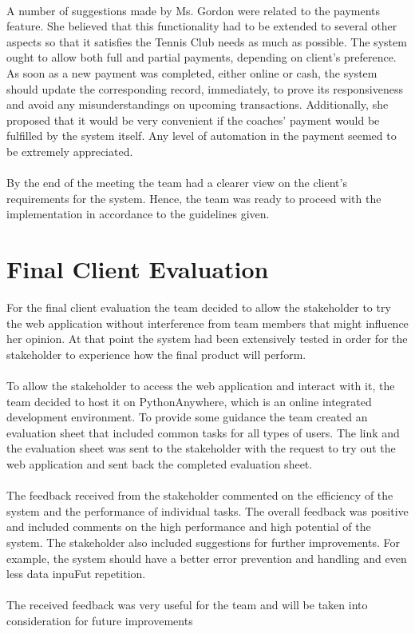 \documentclass{l3proj}
\begin{document}
\\
A number of suggestions made by Ms. Gordon were related to the payments feature. She believed that this functionality had to be extended to several other aspects so that it satisfies the Tennis Club needs as much as possible. The system ought to allow both full and partial payments, depending on client's preference. As soon as a new payment was completed, either online or cash, the system should update the corresponding record, immediately, to prove its responsiveness and avoid any misunderstandings on upcoming transactions. Additionally, she proposed that it would be very convenient if the coaches' payment would be fulfilled by the system itself. Any level of automation in the payment seemed to be extremely appreciated.\\
\\
By the end of the meeting the team had a clearer view on the client's requirements for the system. Hence, the team was ready to proceed with the implementation in accordance to the guidelines given.




\section{Final Client Evaluation}
For the final client evaluation the team decided to allow the stakeholder to try the web application without interference from team members that might influence her opinion. At that point the system had been extensively tested in order for the stakeholder to experience how the final product will perform.\\
\\
To allow the stakeholder to access the web application and interact with it, the team decided to host it on PythonAnywhere, which is an online integrated development environment. To provide some guidance the team created an evaluation sheet that included common tasks for all types of users. The link and the evaluation sheet was sent to the stakeholder with the request to try out the web application and sent back the completed evaluation sheet.\\
\\
The feedback received from the stakeholder commented on the efficiency of the system and the performance of individual tasks. The overall feedback was positive and included comments on the high performance and high potential of the system. The stakeholder also included suggestions for further improvements. For example, the system should have a better error prevention and handling and even less data inpuFut repetition.\\
\\The received feedback was very useful for the team and will be taken into consideration for future improvements
\end{document}
